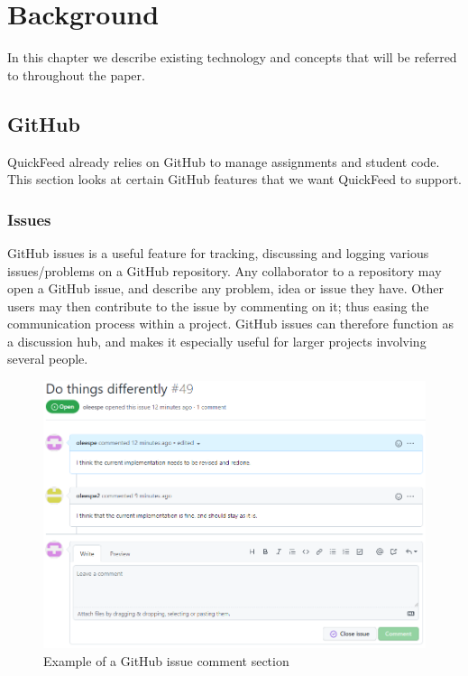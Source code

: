 
\chapter{Background}
\label{ch:background}

In this chapter we describe existing technology and concepts that will be referred to throughout the paper.

\section{GitHub}

QuickFeed already relies on GitHub to manage assignments and student code.
This section looks at certain GitHub features that we want QuickFeed to support.

\subsection{Issues}

GitHub issues is a useful feature for tracking, discussing and logging various issues/problems on a GitHub repository.
Any collaborator to a repository may open a GitHub issue, and describe any problem, idea or issue they have.
Other users may then contribute to the issue by commenting on it; thus easing the communication process within a project.
GitHub issues can therefore function as a discussion hub, and makes it especially useful for larger projects involving several people. 

\begin{figure}[ht]
    \centering
    \includegraphics[width=\textwidth]{photos/github-issue.PNG}
    \caption{Example of a GitHub issue comment section}
    \label{fig:github-issue}
\end{figure}

